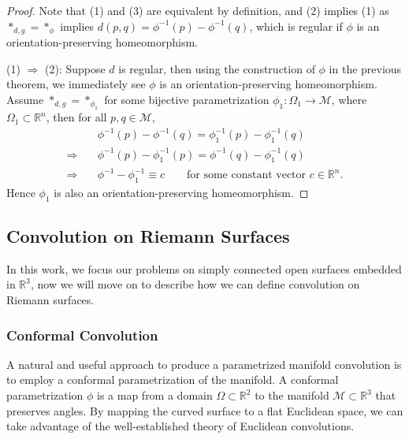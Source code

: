 \begin{proof}
    Note that (1) and (3) are equivalent by definition, and (2) implies (1) as $*_{d,g} = *_\phi$ implies $d(p,q) = \phi^{-1}(p) - \phi^{-1}(q)$, which is regular if $\phi$ is an orientation-preserving homeomorphism.
    
    (1) $\Rightarrow$ (2): Suppose $d$ is regular, then using the construction of $\phi$ in the previous theorem, we immediately see $\phi$ is an orientation-preserving homeomorphism. Assume $*_{d,g} = *_{\phi_1}$ for some bijective parametrization $\phi_1: \Omega_1 \to \mathcal{M}$, where $\Omega_1 \subset \mathbb{R}^n$, then for all $p, q \in \mathcal{M}$,
    \begin{equation}
    \begin{aligned}
        &\phi^{-1}(p) - \phi^{-1}(q) = \phi_1^{-1}(p) - \phi_1^{-1}(q) \\
        \Rightarrow \quad &\phi^{-1}(p) - \phi_1^{-1}(p) = \phi^{-1}(q) - \phi_1^{-1}(q) \\
        \Rightarrow \quad &\phi^{-1} - \phi_1^{-1} \equiv c \qquad \text{for some constant vector } c \in \mathbb{R}^n.
    \end{aligned}
    \end{equation}
    Hence $\phi_1$ is also an orientation-preserving homeomorphism. 
\end{proof}

\subsection{Convolution on Riemann Surfaces}
In this work, we focus our problems on simply connected open surfaces embedded in $\mathbb{R}^3$, now we will move on to describe how we can define convolution on Riemann surfaces.

\subsubsection{Conformal Convolution}
A natural and useful approach to produce a parametrized manifold convolution is to employ a conformal parametrization of the manifold. A conformal parametrization $\phi$ is a map from a domain $\Omega \subset \mathbb{R}^2$ to the manifold $\mathcal{M} \subset \mathbb{R}^3$ that preserves angles. By mapping the curved surface to a flat Euclidean space, we can take advantage of the well-established theory of Euclidean convolutions. 

